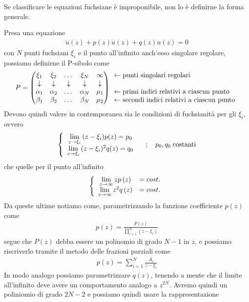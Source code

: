 Se classificare le equazioni fuchsiane è improponibile, non lo è definirne la forma generale.

Presa una equazione
\begin{align}
	\ddot{u}(z) + p(z)\dot{u}(z) + q(z)u(z) = 0
\end{align}
con $N$ punti fuchsiani $\xi_i$ e il punto all'infinito anch'esso singolare regolare, possiamo definirne il P-sibolo come
\begin{align}
	P = \begin{pmatrix}
		\xi_1 & \xi_2 & \dots & \xi_N & \infty\\
		\downarrow & \downarrow & \downarrow & \downarrow & \downarrow\\
		\alpha_1 & \alpha_2 & \dots & \alpha_N & \mu_1\\
		\beta_1 & \beta_2 & \dots & \beta_N & \mu_2
	\end{pmatrix} \begin{array}{c}
	\leftarrow \text{punti singolari regolari} \hfill \\
	\\
	\leftarrow \text{primi indici relativi a ciascun punto}\hfill\\
	\leftarrow \text{secondi indici relativi a ciascun punto}
\end{array}
\end{align}
Devono quindi valere in contemporanea sia le condizioni di fuchsianità per gli $\xi_i$, ovvero
\begin{align}
	\left\{ \begin{array}{cc} \underset{z \rightarrow \xi_i}{\lim} \, (z-\xi_i)p(z) = p_0\\ \underset{z \rightarrow \xi_i}{\lim} \, (z-\xi_i)^2 q(z)= q_0 \end{array} \right. \quad ; \quad p_0, q_0 \; \text{costanti} \label{omegakek}
\end{align}
che quelle per il punto all'infinito
\begin{align}
	\double{\limit{z}{\infty}zp\left(z\right) &= cost. \hfill}{\limit{z}{\infty} z^2 q\left(z\right) &= cost.}
\end{align}
Da queste ultime notiamo come, parametrizzando la funzione coefficiente $p(z)$ come 
\begin{align}
	p(z) = \frac{P(z)}{\prod_{i=1}^{N}(z-\xi_i)}
\end{align}
segue che $P(z)$ debba essere un polinomio di grado $N-1$ in $z$, e possiamo riscriverlo tramite il metodo delle frazioni parziali come
\begin{align}
	p(z) = \sum_{i=1}^{N} \frac{A_i}{z-\xi_i}
\end{align}
In modo analogo possiamo parametrizzare $q(z)$, tenendo a mente che il limite all'infinito deve avere un comportamento analogo a $z^{2N}$. Avremo quindi un poliniomio di grado $2N-2$ e possiamo quindi usare la rappresentazione
